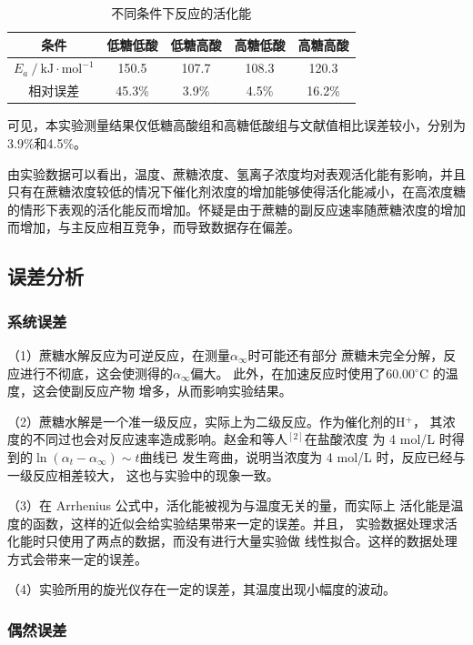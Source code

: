 \documentclass[12pt]{ctexart}
\numberwithin{equation}{section}
\begin{document}
\begin{longtable}{|c|c|c|c|c|}
    \caption{不同条件下反应的活化能}\\
    \hline
    条件 & 低糖低酸 & 低糖高酸 & 高糖低酸 & 高糖高酸 \\
    \hline
    $E_a~/~\mathrm{kJ\cdot mol^{-1}}$  & 150.5 & 107.7 & 108.3 & 120.3 \\
    \hline
    相对误差 & 45.3\% & 3.9\% & 4.5\% & 16.2\% \\
    \hline
\end{longtable}

可见，本实验测量结果仅低糖高酸组和高糖低酸组与文献值相比误差较小，分别为3.9\%和4.5\%。

由实验数据可以看出，温度、蔗糖浓度、氢离子浓度均对表观活化能有影响，并且只有在蔗糖浓度较低的情况下催化剂浓度的增加能够使得活化能减小，在高浓度糖的情形下表观的活化能反而增加。怀疑是由于蔗糖的副反应速率随蔗糖浓度的增加而增加，与主反应相互竞争，而导致数据存在偏差。

\subsection{误差分析}
\subsubsection{系统误差}

（1）蔗糖水解反应为可逆反应，在测量$\alpha_\infty$时可能还有部分
蔗糖未完全分解，反应进行不彻底，这会使测得的$\alpha_\infty$偏大。
此外，在加速反应时使用了60.00$^\circ$C 的温度，这会使副反应产物
增多，从而影响实验结果。

（2）蔗糖水解是一个准一级反应，实际上为二级反应。作为催化剂的H$^+$，
其浓度的不同过也会对反应速率造成影响。赵金和等人$^{[2]}$在盐酸浓度
为 4 mol/L 时得到的$\ln(\alpha_t-\alpha_\infty) \sim t$曲线已
发生弯曲，说明当浓度为 4 mol/L 时，反应已经与一级反应相差较大，
这也与实验中的现象一致。

（3）在 Arrhenius 公式中，活化能被视为与温度无关的量，而实际上
活化能是温度的函数，这样的近似会给实验结果带来一定的误差。并且，
实验数据处理求活化能时只使用了两点的数据，而没有进行大量实验做
线性拟合。这样的数据处理方式会带来一定的误差。

（4）实验所用的旋光仪存在一定的误差，其温度出现小幅度的波动。

\subsubsection{偶然误差}
\end{document}
